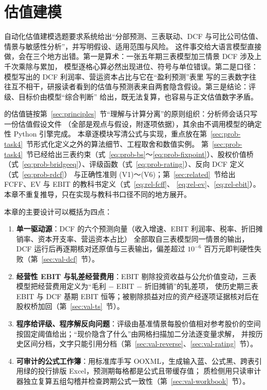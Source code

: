 \section{估值建模}
\label{sec:valuation}

自动化估值建模选题要求系统给出“分部预测、三表联动、DCF 与可比公司估值、情景与敏感性分析”，并写明假设、适用范围与风险。
这件事交给大语言模型直接做，会在三个地方出错。第一是算术：一张五年期三表模型加三情景 DCF 涉及上千次乘除与累加，
模型逐格心算必然出现进位、符号与单位错误。第二是口径：模型写出的 DCF 利润率、营运资本占比与它在“盈利预测”表里
写的三表数字往往互不相干，研报读者看到的估值与预测表来自两套隐含假设。第三是结论：评级、目标价由模型“综合判断”
给出，既无法复算，也容易与正文估值数字矛盾。

\sysname{} 的估值链按第~\ref{sec:principles}~节“理解与计算分离”的原则组织：分析师会话只写一份估值假设文件
（全部是观点与假设，附逐项依据），其余由不调用模型的确定性 Python 引擎完成。
本章逐模块写清公式与实现，重点放在第~\ref{sec:prob-task4}~节形式化定义之外的算法细节、工程取舍和数值实例。
第~\ref{sec:prob-task4}~节已经给出三表约束（式~\eqref{eq:prob-bs}～\eqref{eq:prob-fixpoint}）、股权价值桥
（式~\eqref{eq:prob-bridgeeq}）、评级函数（式~\eqref{eq:prob-rating}）、反向 DCF 定义（式~\eqref{eq:prob-rdcf}）
与正确性准则 (V1)～(V6)；第~\ref{sec:related}~节给出 FCFF、EV 与 EBIT 的教科书定义（式~\eqref{eq:rel-fcff}、
\eqref{eq:rel-ev}、\eqref{eq:rel-ebit}）。本章不重复推导，只在实现与教科书口径不同的地方展开。

本章的主要设计可以概括为四点：
\begin{enumerate}
\item \textbf{单一驱动源}：DCF 的六个预测向量（收入增速、EBIT 利润率、税率、折旧摊销率、资本开支率、营运资本占比）
全部取自三表模型同一情景的输出，DCF 运行后再逐期核对还原值与三表输出，偏差超过 $10^{-6}$ 百万元即判硬性失败（第~\ref{sec:val-dcf}~节）。
\item \textbf{经营性 EBIT 与轧差经营费用}：EBIT 剔除投资收益与公允价值变动，三表模型把经营费用定义为“毛利 − EBIT − 折旧摊销”的轧差项，
使历史期三表 EBIT 与 DCF 基期 EBIT 恒等；被剔除损益对应的资产经逐项证据核对后在股权桥加回（第~\ref{sec:val-ts}~节）。
\item \textbf{程序给评级、程序解反向问题}：评级由基准情景每股价值相对参考股价的空间按固定阈值给出；“现价隐含了什么”由网格扫描加二分法逐变量求解，
并按历史区间分档，文字只能引用分档（第~\ref{sec:val-reverse}、\ref{sec:val-rating}~节）。
\item \textbf{可审计的公式工作簿}：用标准库手写 OOXML，生成输入蓝、公式黑、跨表引用绿的投行排版 Excel，预测期每格都是公式且带缓存值；
质检侧用只读审计器独立复算五组勾稽并检查跨期公式一致性（第~\ref{sec:val-workbook}~节）。
\end{enumerate}

